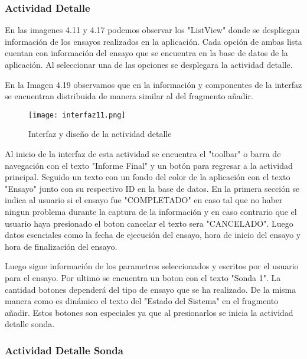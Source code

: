 \subsubsection{Actividad Detalle}

\par 
En las imagenes 4.11 y 4.17 podemos observar los "ListView" donde se despliegan información de los ensayos realizados en la aplicación. Cada opción de ambas lista cuentan con información del ensayo que se encuentra en la base de datos de la aplicación. Al seleccionar una de las opciones se desplegara la actividad detalle. 

\par \noindent
En la Imagen 4.19 observamos que en la información y componentes de la interfaz se encuentran distribuida de manera similar al del fragmento añadir.

\begin{figure}[H]
	\centering
	\texttt{[image: interfaz11.png]}
	\caption{Interfaz y diseño de la actividad detalle}
\end{figure}

\par \noindent
Al inicio de la interfaz de esta actividad se encuentra el "toolbar" o barra de navegación con el texto "Informe Final" y un botón para regresar a la actividad principal. Seguido un texto con un fondo del color de la aplicación con el texto "Ensayo" junto con su respectivo ID en la base de datos. En la primera sección se indica al usuario si el ensayo fue "COMPLETADO" en caso tal que no haber ningun problema durante la captura de la información y en caso contrario que el usuario haya presionado el boton cancelar el texto sera "CANCELADO". Luego datos esenciales como la fecha de ejecución del ensayo, hora de inicio del ensayo y hora de finalización del ensayo.

\par \noindent
Luego sigue información de los parametros seleccionados y escritos por el usuario para el ensayo. Por ultimo se encuentra un boton con el texto "Sonda 1". La cantidad botones dependerá del tipo de ensayo que se ha realizado. De la misma manera como es dinámico el texto del "Estado del Sistema" en el fragmento añadir. Estos botones son especiales ya que al presionarlos se inicia la actividad detalle sonda.

\subsubsection{Actividad Detalle Sonda}

